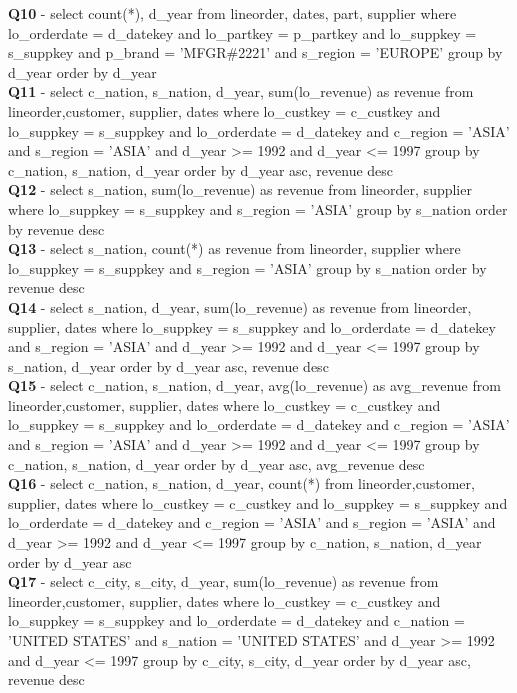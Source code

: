\textbf{Q10} - select count(*), d\_year from lineorder, dates, part, supplier where lo\_orderdate = d\_datekey and lo\_partkey = p\_partkey and lo\_suppkey = s\_suppkey and p\_brand = 'MFGR\#2221' and s\_region = 'EUROPE' group by d\_year order by d\_year \\

\textbf{Q11} - select c\_nation, s\_nation, d\_year, sum(lo\_revenue) as revenue from lineorder,customer,  supplier, dates where lo\_custkey = c\_custkey and lo\_suppkey = s\_suppkey and lo\_orderdate = d\_datekey and c\_region = 'ASIA' and s\_region = 'ASIA' and d\_year >= 1992 and d\_year <= 1997 group by c\_nation, s\_nation, d\_year order by d\_year asc, revenue desc \\

\textbf{Q12 }- select s\_nation, sum(lo\_revenue) as revenue from lineorder, supplier where lo\_suppkey = s\_suppkey and s\_region = 'ASIA' group by s\_nation order by revenue desc \\

\textbf{Q13} - select s\_nation, count(*) as revenue from lineorder, supplier where lo\_suppkey = s\_suppkey and s\_region = 'ASIA' group by s\_nation order by revenue desc \\

\textbf{Q14} - select s\_nation, d\_year, sum(lo\_revenue) as revenue from lineorder, supplier, dates where lo\_suppkey = s\_suppkey and lo\_orderdate = d\_datekey and s\_region = 'ASIA' and d\_year >= 1992 and d\_year <= 1997 group by s\_nation, d\_year order by d\_year asc, revenue desc \\

\textbf{Q15} - select c\_nation, s\_nation, d\_year, avg(lo\_revenue) as avg\_revenue from lineorder,customer,  supplier, dates where lo\_custkey = c\_custkey and lo\_suppkey = s\_suppkey and lo\_orderdate = d\_datekey and c\_region = 'ASIA' and s\_region = 'ASIA' and d\_year >= 1992 and d\_year <= 1997 group by c\_nation, s\_nation, d\_year order by d\_year asc, avg\_revenue desc \\

\textbf{Q16} - select c\_nation, s\_nation, d\_year, count(*) from lineorder,customer,  supplier, dates where lo\_custkey = c\_custkey and lo\_suppkey = s\_suppkey and lo\_orderdate = d\_datekey and c\_region = 'ASIA' and s\_region = 'ASIA' and d\_year >= 1992 and d\_year <= 1997 group by c\_nation, s\_nation, d\_year order by d\_year asc \\

\textbf{Q17} - select c\_city, s\_city, d\_year, sum(lo\_revenue) as revenue from lineorder,customer,  supplier, dates where lo\_custkey = c\_custkey and lo\_suppkey = s\_suppkey and lo\_orderdate = d\_datekey and c\_nation = 'UNITED STATES' and s\_nation = 'UNITED STATES' and d\_year >= 1992 and d\_year <= 1997 group by c\_city, s\_city, d\_year order by d\_year asc, revenue desc \\

